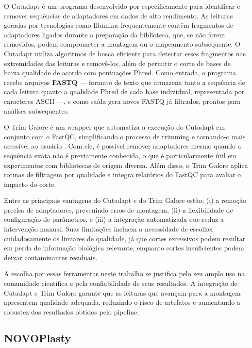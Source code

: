 O Cutadapt é um programa desenvolvido por  especificamente para identificar e remover sequências de adaptadores em dados de alto rendimento. As leituras geradas por tecnologias como Illumina frequentemente contêm fragmentos de adaptadores ligados durante a preparação da biblioteca, que, se não forem removidos, podem comprometer a montagem ou o mapeamento subsequente. O Cutadapt utiliza algoritmos de busca eficiente para detectar esses fragmentos nas extremidades das leituras e removê-los, além de permitir o corte de bases de baixa qualidade de acordo com pontuações Phred. Como entrada, o programa recebe arquivos \textbf{FASTQ} --- formato de texto que armazena tanto a sequência de cada leitura quanto a qualidade Phred de cada base individual, representada por caracteres ASCII ---, e como saída gera novos FASTQ já filtrados, prontos para análises subsequentes.

O Trim Galore é um wrapper que automatiza a execução do Cutadapt em conjunto com o FastQC, simplificando o processo de trimming e tornando-o mais acessível ao usuário \cite{babraham2019}. Com ele, é possível remover adaptadores mesmo quando a sequência exata não é previamente conhecida, o que é particularmente útil em experimentos com bibliotecas de origem diversa. Além disso, o Trim Galore aplica rotinas de filtragem por qualidade e integra relatórios do FastQC para avaliar o impacto do corte.

Entre as principais vantagens do Cutadapt e do Trim Galore estão: (i) a remoção precisa de adaptadores, prevenindo erros de montagem, (ii) a flexibilidade de configuração de parâmetros, e (iii) a integração automatizada que reduz a intervenção manual. Suas limitações incluem a necessidade de escolher cuidadosamente os limiares de qualidade, já que cortes excessivos podem resultar em perda de informação biológica relevante, enquanto cortes insuficientes podem deixar contaminantes residuais.

A escolha por essas ferramentas neste trabalho se justifica pelo seu amplo uso na comunidade científica e pela confiabilidade de seus resultados. A integração de Cutadapt e Trim Galore garante que as leituras que avançam para a montagem apresentem qualidade adequada, reduzindo o risco de artefatos e aumentando a robustez dos resultados obtidos pelo pipeline.

\subsection{NOVOPlasty}

